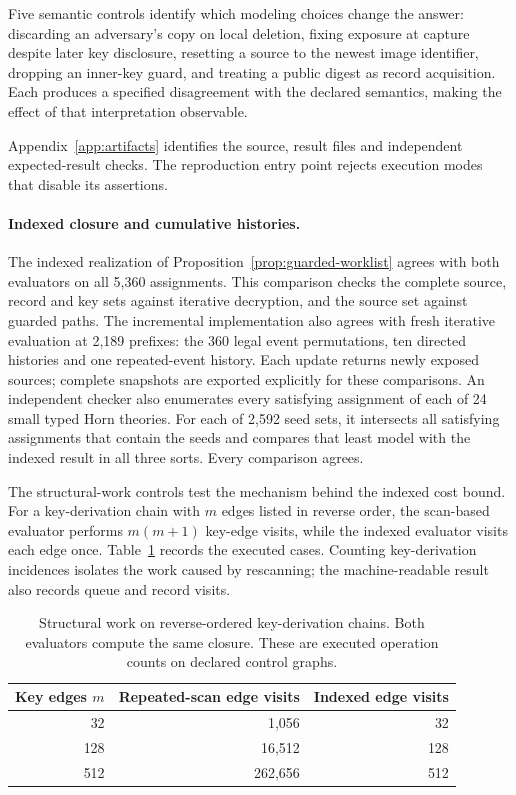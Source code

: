 Five semantic controls identify which modeling choices change the answer:
discarding an adversary's copy on local deletion, fixing exposure at capture
despite later key disclosure, resetting a source to the newest image
identifier, dropping an inner-key guard, and treating a public digest as
record acquisition. Each produces a specified disagreement with the
declared semantics, making the effect of that interpretation observable.

Appendix~\ref{app:artifacts} identifies the source, result files and
independent expected-result checks. The reproduction entry point rejects
execution modes that disable its assertions.

\paragraph{Indexed closure and cumulative histories.}
The indexed realization of Proposition~\ref{prop:guarded-worklist} agrees
with both evaluators on all 5,360 assignments. This comparison
checks the complete source, record and key sets against iterative decryption,
and the source set against guarded paths. The incremental implementation
also agrees with fresh iterative evaluation at 2,189 prefixes: the 360 legal
event permutations, ten directed histories and one repeated-event history.
Each update returns newly exposed sources; complete snapshots are exported
explicitly for these comparisons.
An independent checker also enumerates every satisfying assignment of each
of 24 small typed Horn theories. For each of 2,592 seed sets, it intersects
all satisfying assignments that contain the seeds and compares that least
model with the indexed result in all three sorts. Every comparison agrees.

The structural-work controls test the mechanism behind the indexed cost
bound. For a key-derivation chain with $m$ edges listed in reverse order,
the scan-based evaluator performs $m(m+1)$ key-edge visits, while the indexed
evaluator visits each edge once. Table~\ref{tab:indexed-key-work} records
the executed cases. Counting key-derivation incidences isolates the work
caused by rescanning; the machine-readable result also records queue and
record visits.

\begin{table}[t]
\centering
\small
\begin{tabular}{@{}rrr@{}}
\toprule
Key edges $m$ & Repeated-scan edge visits & Indexed edge visits\\
\midrule
32 & 1,056 & 32\\
128 & 16,512 & 128\\
512 & 262,656 & 512\\
\bottomrule
\end{tabular}
\caption{Structural work on reverse-ordered key-derivation chains.
Both evaluators compute the same closure. These are executed operation
counts on declared control graphs.}
\label{tab:indexed-key-work}
\end{table}

